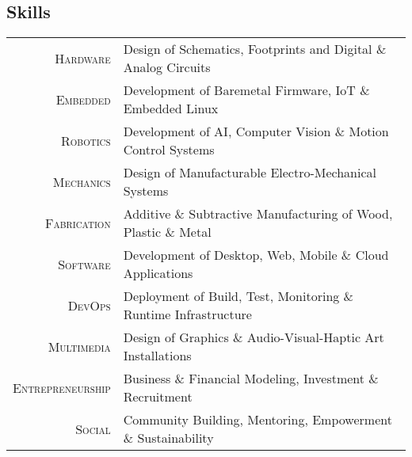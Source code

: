 \subsection{Skills}
\begin{longtable}
		{r|p{13cm}}
		\textsc{Hardware} & Design of Schematics, Footprints and Digital \& Analog Circuits\\
		\textsc{Embedded} & Development of Baremetal Firmware, IoT \& Embedded Linux\\
		\textsc{Robotics} & Development of AI, Computer Vision \& Motion Control Systems\\
		\textsc{Mechanics} & Design of Manufacturable Electro-Mechanical Systems\\
		\textsc{Fabrication} & Additive \& Subtractive Manufacturing of Wood, Plastic \& Metal\\
		\textsc{Software} & Development of Desktop, Web, Mobile \& Cloud Applications\\
		\textsc{DevOps} & Deployment of Build, Test, Monitoring \& Runtime Infrastructure\\
		\textsc{Multimedia} & Design of Graphics \& Audio-Visual-Haptic Art Installations\\
		\textsc{Entrepreneurship} & Business \& Financial Modeling, Investment \& Recruitment\\
		\textsc{Social} & Community Building, Mentoring, Empowerment \& Sustainability\\
\end{longtable}
